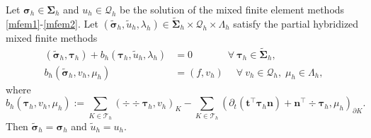 \begin{lemma}
Let $\boldsymbol \sigma_h\in\boldsymbol\Sigma_h$ and $u_h\in \mathcal Q_h$ be the solution of the mixed finite element methods \eqref{mfem1}-\eqref{mfem2}.
Let $(\widetilde{\boldsymbol\sigma}_h, \widetilde{u}_h, \lambda_h)\in\widetilde{\boldsymbol\Sigma}_h\times\mathcal Q_h\times\Lambda_h$ satisfy the partial hybridized mixed finite methods
\begin{align}
(\widetilde{\boldsymbol\sigma}_h, \boldsymbol{\tau}_h)+b_h(\boldsymbol{\tau}_h, \widetilde{u}_h, \lambda_h)&=0 \quad\quad\quad\;\; \forall~\boldsymbol{\tau}_h\in \widetilde{\boldsymbol\Sigma}_h, \label{mfemhybrid1} \\
b_h(\widetilde{\boldsymbol\sigma}_h, v_h, \mu_h)&=(f, v_h) \quad\; \forall~v_h\in \mathcal Q_h,\; \mu_h\in\Lambda_h, \label{mfemhybrid2}
\end{align}
where
\[
b_h(\boldsymbol{\tau}_h, v_h, \mu_h):=\sum_{K\in\mathcal T_h}(\div\div\boldsymbol \tau_h, v_h)_K-\sum_{K\in\mathcal T_h}(\partial_{t}(\boldsymbol  t^{\intercal}\boldsymbol \tau_h\boldsymbol  n)+\boldsymbol  n^{\intercal}\div\boldsymbol \tau_h,  \mu_h)_{\partial K}.
\]
Then $\widetilde{\boldsymbol\sigma}_h=\boldsymbol \sigma_h$ and $\widetilde{u}_h=u_h$.
\end{lemma}

